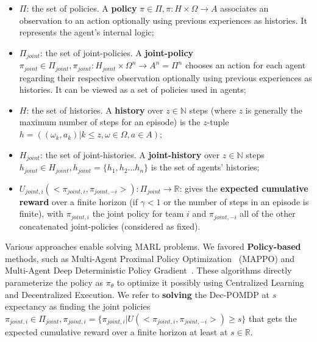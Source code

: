 \documentclass[runningheads]{llncs}
\theoremstyle{freethm}
\theoremstyle{proofoutline}
\begin{document}
\begin{itemize}

    \item $\Pi$: the set of policies. A \textbf{policy} $\pi \in \Pi, \pi: H \times \Omega \rightarrow A$ associates an observation to an action optionally using previous experiences as histories. It represents the agent's internal logic;
    \item $\Pi_{joint}$: the set of joint-policies. A \textbf{joint-policy} $\pi_{joint} \in \Pi_{joint}, \pi_{joint}: H_{joint} \times \Omega^n \rightarrow A^n = \Pi^n$ chooses an action for each agent regarding their respective observation optionally using previous experiences as histories. It can be viewed as a set of policies used in agents;
    \item $H$: the set of histories. A \textbf{history} over $z \in \mathbb{N}$ steps (where $z$ is generally the maximum number of steps for an episode) is the $z$-tuple $h = ((\omega_{k}, a_{k}) | k \leq z, \omega \in \Omega, a \in A)$;
    \item $H_{joint}$: the set of joint-histories. A \textbf{joint-history} over $z \in \mathbb{N}$ steps $h_{joint} \in H_{joint}, h_{joint} = \{h_1,h_2 \dots h_n\}$ is the set of agents' histories;
    \item $U_{joint,i}(<\pi_{joint,i}, \pi_{joint,-i}>): \Pi_{joint} \rightarrow \mathbb{R}$: gives the \textbf{expected cumulative reward} over a finite horizon (if $\gamma < 1$ or the number of steps in an episode is finite), with $\pi_{joint,i}$ the joint policy for team $i$ and $\pi_{joint,-i}$ all of the other concatenated joint-policies (considered as fixed).
\end{itemize}

Various approaches enable solving MARL problems. We favored \textbf{Policy-based} methods, such as Multi-Agent Proximal Policy Optimization~\cite{yu2022surprising} (MAPPO) and Multi-Agent Deep Deterministic Policy Gradient~\cite{Lowe2017}. These algorithms directly parameterize the policy as $\pi_\theta$ to optimize it possibly using Centralized Learning and Decentralized Execution.
We refer to \textbf{solving} the Dec-POMDP at $s$ expectancy as finding the joint policies $\pi_{joint,i} \in \Pi_{joint}, \pi_{joint,i} = \{\pi_{joint,i} | U(<\pi_{joint,i},\pi_{joint,-i}>) \geq s\}$ that gets the expected cumulative reward over a finite horizon at least at $s \in \mathbb{R}$.
\end{document}
